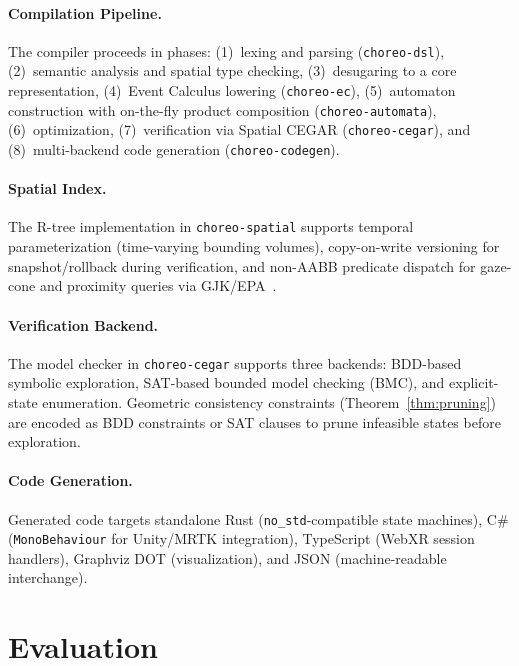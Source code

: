\documentclass[11pt,a4paper]{article}
\begin{document}
\paragraph{Compilation Pipeline.}
The compiler proceeds in phases: (1)~lexing and parsing
(\texttt{choreo-dsl}), (2)~semantic analysis and spatial type
checking, (3)~desugaring to a core representation, (4)~Event Calculus
lowering (\texttt{choreo-ec}), (5)~automaton construction with
on-the-fly product composition (\texttt{choreo-automata}),
(6)~optimization, (7)~verification via Spatial CEGAR
(\texttt{choreo-cegar}), and (8)~multi-backend code generation
(\texttt{choreo-codegen}).

\paragraph{Spatial Index.}
The R-tree implementation in \texttt{choreo-spatial} supports temporal
parameterization (time-varying bounding volumes), copy-on-write
versioning for snapshot/rollback during verification, and non-AABB
predicate dispatch for gaze-cone and proximity queries via
GJK/EPA~\cite{gjk1988,epa2001}.

\paragraph{Verification Backend.}
The model checker in \texttt{choreo-cegar} supports three backends:
BDD-based symbolic exploration, SAT-based bounded model checking (BMC),
and explicit-state enumeration.  Geometric consistency constraints
(Theorem~\ref{thm:pruning}) are encoded as BDD constraints or SAT
clauses to prune infeasible states before exploration.

\paragraph{Code Generation.}
Generated code targets standalone Rust
(\texttt{no\_std}-compatible state machines), C\#
(\texttt{MonoBehaviour} for Unity/MRTK integration), TypeScript
(WebXR session handlers), Graphviz DOT (visualization), and JSON
(machine-readable interchange).

\section{Evaluation}

\end{document}
